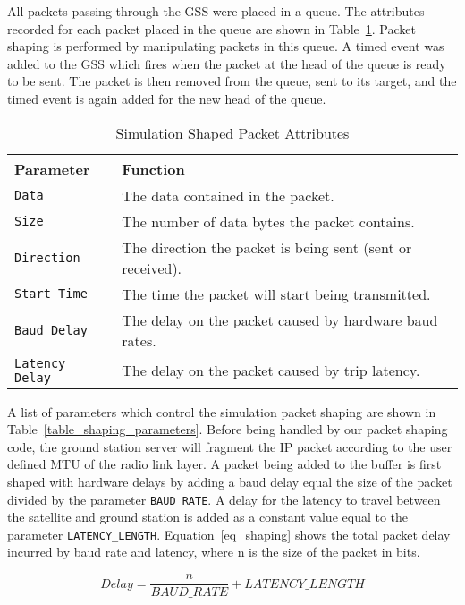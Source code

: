 \documentclass[journal]{./IEEEtran}
\begin{document}
All packets passing through the GSS were placed in a queue.  The attributes recorded for each packet placed in the queue are shown in Table~\ref{table_packet_attributes}.  Packet shaping is performed by manipulating packets in this queue.  A timed event was added to the GSS which fires when the packet at the head of the queue is ready to be sent.  The packet is then removed from the queue, sent to its target, and the timed event is again added for the new head of the queue.

\begin{table}[h!]
\caption{Simulation Shaped Packet Attributes}
\label{table_packet_attributes}
\begin{center}
\begin{tabular}{|l|p{5.5cm}|} \hline
\textbf{Parameter} & \textbf{Function} \\ \hline
{\tt Data} & The data contained in the packet. \\ \hline
{\tt Size} & The number of data bytes the packet contains. \\ \hline
{\tt Direction} & The direction the packet is being sent (sent or received). \\ \hline
{\tt Start Time}  & The time the packet will start being transmitted. \\ \hline
{\tt Baud Delay}  & The delay on the packet caused by hardware baud rates. \\ \hline
{\tt Latency Delay}  & The delay on the packet caused by trip latency. \\ \hline
\end{tabular}
\end{center}
\end{table}

A list of parameters which control the simulation packet shaping are shown in  Table~\ref{table_shaping_parameters}.  Before being handled by our packet shaping code, the ground station server will fragment the IP packet according to the user defined MTU of the radio link layer.  A packet being added to the buffer is first shaped with hardware delays by adding a baud delay equal the size of the packet divided by the parameter {\tt BAUD\_RATE}.  A delay for the latency to travel between the satellite and ground station is added as a constant value equal to the parameter {\tt LATENCY\_LENGTH}.  Equation~\ref{eq_shaping} shows the total packet delay incurred by baud rate and latency, where n is the size of the packet in bits.  


\begin{equation}
\label{eq_shaping}
Delay = \frac{n}{BAUD\_RATE} + LATENCY\_LENGTH
\end{equation}
\end{document}
